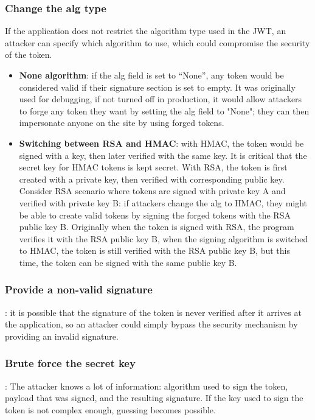 \documentclass[a4paper, 10pt, titlepage]{article}
\begin{document}
\subsubsection*{Change the alg type}
If the application does not restrict the algorithm type used in the JWT, an attacker can specify which algorithm to use, which could compromise the security of the token.
\begin{itemize}
\item \textbf{None algorithm}: if the alg field is set to “None”, any token would be considered valid if their signature section is set to empty. It was originally used for debugging, if not turned off in production, it would allow attackers to forge any token they want by setting the alg field to "None"; they can then impersonate anyone on the site by using forged tokens.
\item \textbf{Switching between RSA and HMAC}: with HMAC, the token would be signed with a key, then later verified with the same key. It is critical that the secret key for HMAC tokens is kept secret. With RSA, the token is first created with a private key, then verified with corresponding public key. Consider RSA scenario where tokens are signed with private key A and verified with private key B: if attackers change the alg to HMAC, they might be able to create valid tokens by signing the forged tokens with the RSA public key B. Originally when the token is signed with RSA, the program verifies it with the RSA public key B, when the signing algorithm is switched to HMAC, the token is still verified with the RSA public key B, but this time, the token can be signed with the same public key B.
\end{itemize}

\subsubsection*{Provide a non-valid signature}: it is possible that the signature of the token is never verified after it arrives at the application, so an attacker could simply bypass the security mechanism by providing an invalid signature.

\subsubsection*{Brute force the secret key}: The attacker knows a lot of information: algorithm used to sign the token, payload that was signed, and the resulting signature. If the key used to sign the token is not complex enough, guessing becomes possible.
\end{document}
